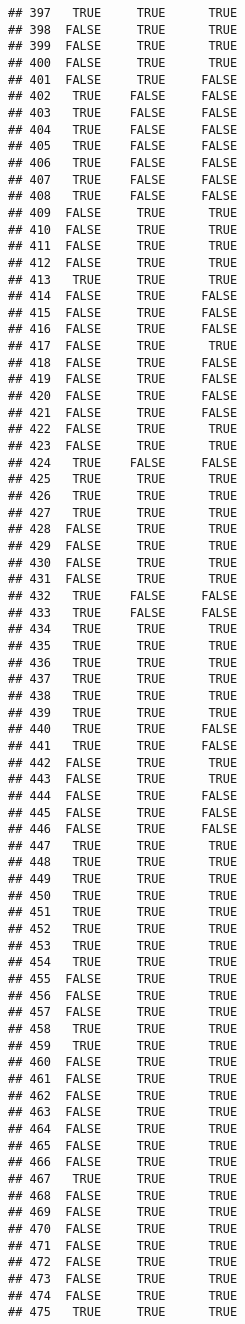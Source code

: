 \documentclass[
]{article}
\begin{document}
\begin{verbatim}
## 397   TRUE     TRUE      TRUE
## 398  FALSE     TRUE      TRUE
## 399  FALSE     TRUE      TRUE
## 400  FALSE     TRUE      TRUE
## 401  FALSE     TRUE     FALSE
## 402   TRUE    FALSE     FALSE
## 403   TRUE    FALSE     FALSE
## 404   TRUE    FALSE     FALSE
## 405   TRUE    FALSE     FALSE
## 406   TRUE    FALSE     FALSE
## 407   TRUE    FALSE     FALSE
## 408   TRUE    FALSE     FALSE
## 409  FALSE     TRUE      TRUE
## 410  FALSE     TRUE      TRUE
## 411  FALSE     TRUE      TRUE
## 412  FALSE     TRUE      TRUE
## 413   TRUE     TRUE      TRUE
## 414  FALSE     TRUE     FALSE
## 415  FALSE     TRUE     FALSE
## 416  FALSE     TRUE     FALSE
## 417  FALSE     TRUE      TRUE
## 418  FALSE     TRUE     FALSE
## 419  FALSE     TRUE     FALSE
## 420  FALSE     TRUE     FALSE
## 421  FALSE     TRUE     FALSE
## 422  FALSE     TRUE      TRUE
## 423  FALSE     TRUE      TRUE
## 424   TRUE    FALSE     FALSE
## 425   TRUE     TRUE      TRUE
## 426   TRUE     TRUE      TRUE
## 427   TRUE     TRUE      TRUE
## 428  FALSE     TRUE      TRUE
## 429  FALSE     TRUE      TRUE
## 430  FALSE     TRUE      TRUE
## 431  FALSE     TRUE      TRUE
## 432   TRUE    FALSE     FALSE
## 433   TRUE    FALSE     FALSE
## 434   TRUE     TRUE      TRUE
## 435   TRUE     TRUE      TRUE
## 436   TRUE     TRUE      TRUE
## 437   TRUE     TRUE      TRUE
## 438   TRUE     TRUE      TRUE
## 439   TRUE     TRUE      TRUE
## 440   TRUE     TRUE     FALSE
## 441   TRUE     TRUE     FALSE
## 442  FALSE     TRUE      TRUE
## 443  FALSE     TRUE      TRUE
## 444  FALSE     TRUE     FALSE
## 445  FALSE     TRUE     FALSE
## 446  FALSE     TRUE     FALSE
## 447   TRUE     TRUE      TRUE
## 448   TRUE     TRUE      TRUE
## 449   TRUE     TRUE      TRUE
## 450   TRUE     TRUE      TRUE
## 451   TRUE     TRUE      TRUE
## 452   TRUE     TRUE      TRUE
## 453   TRUE     TRUE      TRUE
## 454   TRUE     TRUE      TRUE
## 455  FALSE     TRUE      TRUE
## 456  FALSE     TRUE      TRUE
## 457  FALSE     TRUE      TRUE
## 458   TRUE     TRUE      TRUE
## 459   TRUE     TRUE      TRUE
## 460  FALSE     TRUE      TRUE
## 461  FALSE     TRUE      TRUE
## 462  FALSE     TRUE      TRUE
## 463  FALSE     TRUE      TRUE
## 464  FALSE     TRUE      TRUE
## 465  FALSE     TRUE      TRUE
## 466  FALSE     TRUE      TRUE
## 467   TRUE     TRUE      TRUE
## 468  FALSE     TRUE      TRUE
## 469  FALSE     TRUE      TRUE
## 470  FALSE     TRUE      TRUE
## 471  FALSE     TRUE      TRUE
## 472  FALSE     TRUE      TRUE
## 473  FALSE     TRUE      TRUE
## 474  FALSE     TRUE      TRUE
## 475   TRUE     TRUE      TRUE

\end{verbatim}
\end{document}
